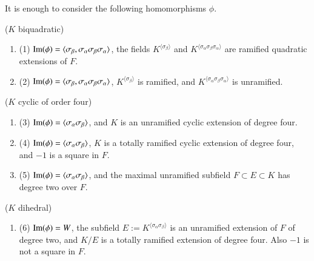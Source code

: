 \documentclass{amsart}
\newcommand\Ima{\hbox{Im}}
\newenvironment{cthm}[1]
  {\renewcommand\thethm{\sc #1}\thm}
  {\endthm}
\begin{document}
\bigskip
\noindent
\begin{cthm}{Lemma 3.2}   It is enough to consider the following
homomorphisms $\phi$. 

\noindent($K$ biquadratic)
\begin{enumerate}[label=]
\item (1) $\Ima(\phi)=\langle\sigma_\beta,\sigma_\alpha\sigma_\beta
   \sigma_\alpha\rangle$, the fields
   $K^{\langle\sigma_\beta\rangle}$ and $K^{\langle
       \sigma_\alpha\sigma_\beta\sigma_\alpha\rangle}$ are
  ramified quadratic extensions of $F$.

\item (2) $\Ima(\phi)=\langle\sigma_\beta,\sigma_\alpha\sigma_\beta
   \sigma_\alpha\rangle$,
   $K^{\langle\sigma_\beta\rangle}$ is ramified, and $K^{\langle
       \sigma_\alpha\sigma_\beta\sigma_\alpha\rangle}$ is unramified.
\smallskip
\end{enumerate}
($K$ cyclic of order four)
\begin{enumerate}[label=]
\item (3)  $\Ima(\phi)=\langle\sigma_\alpha\sigma_\beta\rangle$, and $K$
 is an unramified cyclic extension of degree four.

\item(4)   $\Ima(\phi)=\langle\sigma_\alpha\sigma_\beta\rangle$, $K$
 is a totally ramified cyclic extension of degree four, and
$-1$ is a square in $F$.

\item (5)  $\Ima(\phi)=\langle\sigma_\alpha\sigma_\beta\rangle$, and the
 maximal unramified subfield 
 $F\subset E\subset K$ has degree two over $F$.
\end{enumerate}
\smallskip
($K$ dihedral)
\begin{enumerate}[label=]
\item(6)  $\Ima(\phi) = W$, the subfield 
$E:= K^{\langle\sigma_\alpha\sigma_\beta\rangle}$
is an unramified extension of $F$ of degree two, and $K/E$ is a
totally ramified extension of degree four.
Also $-1$ is not a square in $F$.
\end{enumerate}
\end{cthm}
\end{document}
